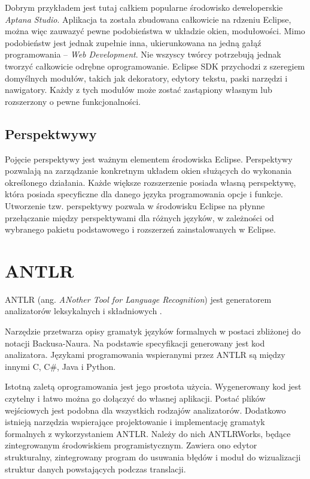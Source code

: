 Dobrym przykładem jest tutaj całkiem popularne środowisko deweloperskie \emph{Aptana Studio}. Aplikacja ta została zbudowana całkowicie na rdzeniu Eclipse, można więc zauwazyć pewne podobieństwa w układzie okien, modułowości. Mimo podobieństw jest jednak zupełnie inna, ukierunkowana na jedną gałąź programowania – \emph{Web Development}. Nie wszyscy twórcy potrzebują jednak tworzyć całkowicie odrębne oprogramowanie. Eclipse SDK przychodzi z szeregiem domyślnych modułów, takich jak dekoratory, edytory tekstu, paski narzędzi i nawigatory. Każdy z tych modułów może zostać zastąpiony własnym lub rozszerzony o pewne funkcjonalności.

\subsection{Perspektwywy}
Pojęcie perspektywy jest ważnym elementem środowiska Eclipse. Perspektywy pozwalają na zarządzanie konkretnym układem okien służących do wykonania określonego działania. Każde większe rozszerzenie posiada własną perspektywę, która posiada specyficzne dla danego języka programowania opcje i funkcje. Utworzenie tzw. perspektywy pozwala w środowisku Eclipse na płynne przełączanie między perspektywami dla różnych języków, w zależności od wybranego pakietu podstawowego i rozszerzeń zainstalowanych w Eclipse.

\section{ANTLR}
ANTLR (ang. \emph{ANother Tool for Language Recognition}) jest generatorem
analizatorów leksykalnych i składniowych \cite{antlr}.

Narzędzie przetwarza opisy gramatyk języków formalnych w postaci 
zbliżonej do notacji
 Backusa-Naura. Na podstawie specyfikacji generowany jest kod analizatora.
Językami programowania wspieranymi przez ANTLR są między innymi C, C\#, Java
i Python.

Istotną zaletą oprogramowania jest jego prostota użycia. Wygenerowany kod 
jest czytelny i  łatwo można go dołączyć do własnej aplikacji. Postać plików
wejściowych jest podobna dla wszystkich rodzajów analizatorów. Dodatkowo
istnieją narzędzia wspierające projektowanie i implementację gramatyk
formalnych z wykorzystaniem ANTLR. Należy do nich ANTLRWorks, będące
zintegrowanym środowiskiem programistycznym. Zawiera ono edytor strukturalny,
zintegrowany program do usuwania błędów i moduł do wizualizacji struktur 
danych powstających podczas translacji.

